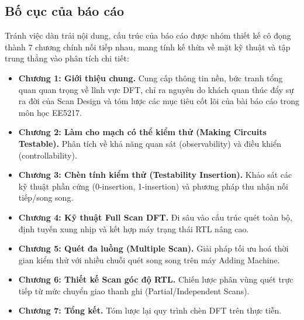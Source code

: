 \subsection{Bố cục của báo cáo}
Tránh việc dàn trải nội dung, cấu trúc của báo cáo được nhóm thiết kế cô đọng thành 7 chương chính nối tiếp nhau, mang tính kế thừa về mặt kỹ thuật và tập trung thẳng vào phân tích chi tiết:
\begin{itemize}
    \item \textbf{Chương 1: Giới thiệu chung.} Cung cấp thông tin nền, bức tranh tổng quan quan trọng về lĩnh vực DFT, chỉ ra nguyên do khách quan thúc đẩy sự ra đời của Scan Design và tóm lược các mục tiêu cốt lõi của bài báo cáo trong môn học EE5217.
    \item \textbf{Chương 2: Làm cho mạch có thể kiểm thử (Making Circuits Testable).} Phân tích về khả năng quan sát (observability) và điều khiển (controllability).
    \item \textbf{Chương 3: Chèn tính kiểm thử (Testability Insertion).} Khảo sát các kỹ thuật phần cứng (0-insertion, 1-insertion) và phương pháp thu nhận nối tiếp/song song.
    \item \textbf{Chương 4: Kỹ thuật Full Scan DFT.} Đi sâu vào cấu trúc quét toàn bộ, định tuyến xung nhịp và kết hợp máy trạng thái RTL nâng cao.
    \item \textbf{Chương 5: Quét đa luồng (Multiple Scan).} Giải pháp tối ưu hoá thời gian kiểm thử với nhiều chuỗi quét song song trên máy Adding Machine.
    \item \textbf{Chương 6: Thiết kế Scan góc độ RTL.} Chiến lược phân vùng quét trực tiếp từ mức chuyển giao thanh ghi (Partial/Independent Scans).
    \item \textbf{Chương 7: Tổng kết.} Tóm lược lại quy trình chèn DFT trên thực tiễn.
\end{itemize}

\vspace{1.5cm}
\begin{flushright}
\end{flushright}

